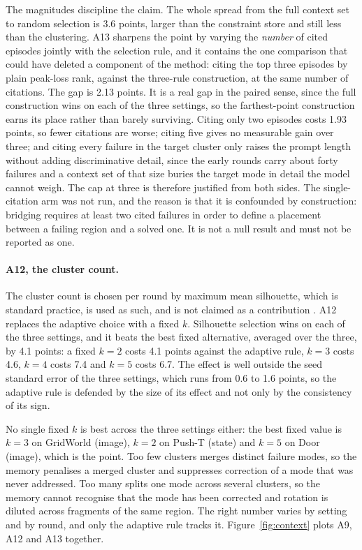 \documentclass[letterpaper]{article}
\begin{document}
The magnitudes discipline the claim. The whole spread from the full context set to
random selection is 3.6 points, larger than the constraint store and still less than the
clustering. A13 sharpens the point by varying the \emph{number} of cited episodes
jointly with the selection rule, and it contains the one comparison that could have
deleted a component of the method: citing the top three episodes by plain peak-loss
rank, against the three-rule construction, at the same number of citations. The gap is
2.13 points. It is a real gap in the paired sense, since the full construction wins on
each of the three settings, so the farthest-point construction earns its place rather
than barely surviving. Citing only two episodes costs 1.93 points, so fewer citations
are worse; citing five gives no measurable gain over three; and citing every failure in
the target cluster only raises the prompt length without adding discriminative detail,
since the early rounds carry about forty failures and a context set of that size buries
the target mode in detail the model cannot weigh. The cap at three is therefore
justified from both sides. The single-citation arm was not run, and the reason is that
it is confounded by construction: bridging requires at least two cited failures in order
to define a placement between a failing region and a solved one. It is not a null result
and must not be reported as one.

\paragraph{A12, the cluster count.} The cluster count is chosen per round by maximum
mean silhouette, which is standard practice, is used as such, and is not claimed as a
contribution \citep{rousseeuw1987silhouette, pedregosa2011sklearn}. A12 replaces the
adaptive choice with a fixed $k$. Silhouette selection wins on each of the three
settings, and it beats the best fixed alternative, averaged over the three, by 4.1
points: a fixed $k = 2$ costs 4.1 points against the adaptive rule, $k = 3$ costs 4.6,
$k = 4$ costs 7.4 and $k = 5$ costs 6.7. The effect is well outside the seed standard
error of the three settings, which runs from 0.6 to 1.6 points, so the adaptive rule is
defended by the size of its effect and not only by the consistency of its sign.

No single fixed $k$ is best across the three settings either: the best fixed value is
$k = 3$ on GridWorld (image), $k = 2$ on Push-T (state) and $k = 5$ on Door (image),
which is the point. Too few clusters merges distinct failure modes, so the memory
penalises a merged cluster and suppresses correction of a mode that was never addressed.
Too many splits one mode across several clusters, so the memory cannot recognise that
the mode has been corrected and rotation is diluted across fragments of the same region.
The right number varies by setting and by round, and only the adaptive rule tracks it.
Figure~\ref{fig:context} plots A9, A12 and A13 together.
\end{document}
